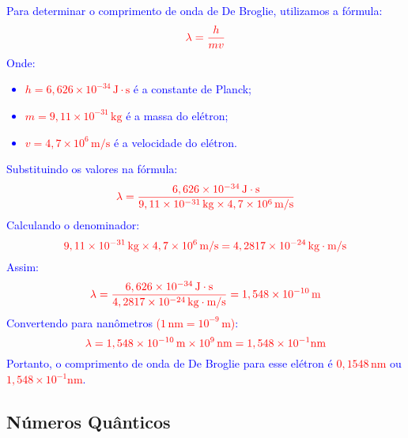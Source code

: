 \documentclass[a4paper, 12pt]{article}
\begin{document}
\begin{enumerate}
	      \textcolor{blue}{
		      Para determinar o comprimento de onda de De Broglie, utilizamos a fórmula:
		      \[
			      \textcolor{red}{\lambda = \frac{h}{mv}}
		      \]
		      Onde:
		      \begin{itemize}
			      \item[] \textcolor{red}{\(h = 6,626 \times 10^{-34} \, \text{J} \cdot \text{s}\)} é a constante de Planck;
			      \item[] \textcolor{red}{\(m = 9,11 \times 10^{-31} \, \text{kg}\)} é a massa do elétron;
			      \item[] \textcolor{red}{\(v = 4,7 \times 10^{6} \, \text{m/s}\)} é a velocidade do elétron.
		      \end{itemize}
		      Substituindo os valores na fórmula:
		      \[
			      \textcolor{red}{\lambda = \frac{6,626 \times 10^{-34} \, \text{J} \cdot \text{s}}{9,11 \times 10^{-31} \, \text{kg} \times 4,7 \times 10^{6} \, \text{m/s}}}
		      \]
		      Calculando o denominador:
		      \[
			      \textcolor{red}{9,11 \times 10^{-31} \, \text{kg} \times 4,7 \times 10^{6} \, \text{m/s} = 4,2817 \times 10^{-24} \, \text{kg} \cdot \text{m/s}}
		      \]
		      Assim:
		      \[
			      \textcolor{red}{\lambda = \frac{6,626 \times 10^{-34} \, \text{J} \cdot \text{s}}{4,2817 \times 10^{-24} \, \text{kg} \cdot \text{m/s}} = 1,548 \times 10^{-10} \, \text{m}}
		      \]
		      Convertendo para nanômetros \textcolor{red}{{(\(1 \, \text{nm} = 10^{-9} \, \text{m}\))}}:
		      \[
			      \textcolor{red}{\lambda = 1,548 \times 10^{-10} \, \text{m} \times 10^{9} \, \text{nm} = 1,548 \times 10^{-1} \text{nm}}
		      \]
		      Portanto, o comprimento de onda de De Broglie para esse elétron é \textcolor{red}{\(0,1548 \, \text{nm}\)} ou \textcolor{red}{\(1,548 \times 10^{-1} \text{nm}\)}. 
	      }
	      
\end{enumerate}

\subsection*{Números Quânticos}
\end{document}
